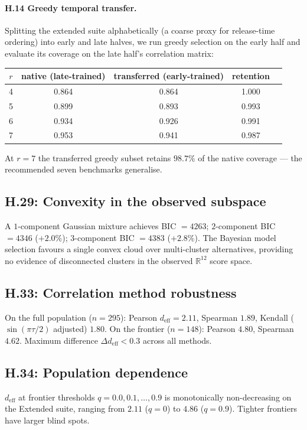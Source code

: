 \documentclass{article}
\begin{document}
\paragraph{H.14 Greedy temporal transfer.}
Splitting the extended suite alphabetically (a coarse proxy for
release-time ordering) into early and late halves, we run greedy
selection on the early half and evaluate its coverage on the late
half's correlation matrix:
\begin{center}\small
\begin{tabular}{ccccc}
\toprule
$r$ & native (late-trained) & transferred (early-trained) & retention \\
\midrule
4  & 0.864 & 0.864 & 1.000 \\
5  & 0.899 & 0.893 & 0.993 \\
6  & 0.934 & 0.926 & 0.991 \\
7  & 0.953 & 0.941 & 0.987 \\
\bottomrule
\end{tabular}
\end{center}
At $r = 7$ the transferred greedy subset retains $98.7\%$ of the
native coverage --- the recommended seven benchmarks generalise.


\subsection*{H.29: Convexity in the observed subspace}
A $1$-component Gaussian mixture achieves BIC $= 4263$; $2$-component
BIC $= 4346$ ($+2.0\%$); $3$-component BIC $= 4383$ ($+2.8\%$). The
Bayesian model selection favours a single convex cloud over
multi-cluster alternatives, providing no evidence of disconnected
clusters in the observed $\mathbb{R}^{12}$ score space.

\subsection*{H.33: Correlation method robustness}
On the full population ($n = 295$): Pearson $d_{\mathrm{eff}} = 2.11$,
Spearman $1.89$, Kendall ($\sin(\pi\tau/2)$ adjusted) $1.80$.
On the frontier ($n = 148$): Pearson $4.80$, Spearman $4.62$.
Maximum difference $\Delta d_{\mathrm{eff}} < 0.3$ across all methods.

\subsection*{H.34: Population dependence}
$d_{\mathrm{eff}}$ at frontier thresholds $q = 0.0, 0.1, \ldots, 0.9$
is monotonically non-decreasing on the Extended suite, ranging from
$2.11$ ($q = 0$) to $4.86$ ($q = 0.9$). Tighter frontiers have
larger blind spots.
\end{document}
